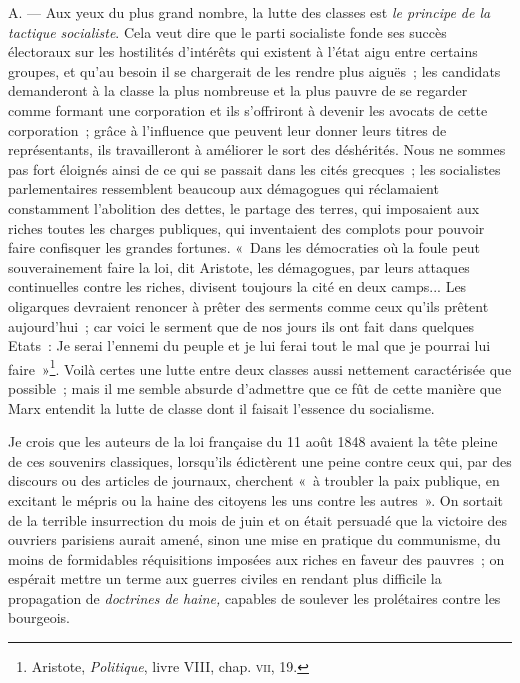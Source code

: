 \documentclass[french,twoside]{book} %
\begin{document}
\noindent A. — Aux yeux du plus grand nombre, la lutte des classes est \emph{le principe de la tactique socialiste}. Cela veut dire que le parti socialiste fonde ses succès électoraux sur les hostilités d’intérêts qui existent à l’état aigu entre certains groupes, et qu’au besoin il se chargerait de les rendre plus aiguës ; les candidats demanderont à la classe la plus nombreuse et la plus pauvre de se regarder comme formant une corporation et ils s’offriront à devenir  les avocats de cette corporation ; grâce à l’influence que peuvent leur donner leurs titres de représentants, ils travailleront à améliorer le sort des déshérités. Nous ne sommes pas fort éloignés ainsi de ce qui se passait dans les cités grecques ; les socialistes parlementaires ressemblent beaucoup aux démagogues qui réclamaient constamment l’abolition des dettes, le partage des terres, qui imposaient aux riches toutes les charges publiques, qui inventaient des complots pour pouvoir faire confisquer les grandes fortunes. « Dans les démocraties où la foule peut souverainement faire la loi, dit Aristote, les démagogues, par leurs attaques continuelles contre les riches, divisent toujours la cité en deux camps... Les oligarques devraient renoncer à prêter des serments comme ceux qu’ils prêtent aujourd’hui ; car voici le serment que de nos jours ils ont fait dans quelques Etats : Je serai l’ennemi du peuple et je lui ferai tout le mal que je pourrai lui faire »\footnote{ \noindent Aristote, \emph{Politique}, livre VIII, chap. {\scshape vii}, 19.
 }. Voilà certes une lutte entre deux classes aussi nettement caractérisée que possible ; mais il me semble absurde d’admettre que ce fût de cette manière que Marx entendit la lutte de classe dont il faisait l’essence du socialisme.\par
Je crois que les auteurs de la loi française du 11 août 1848 avaient la tête pleine de ces souvenirs classiques, lorsqu’ils édictèrent une peine contre ceux qui, par des discours ou des articles de journaux, cherchent « à troubler la paix publique, en excitant le mépris ou la haine des citoyens les uns contre les autres ». On sortait de la  terrible insurrection du mois de juin et on était persuadé que la victoire des ouvriers parisiens aurait amené, sinon une mise en pratique du communisme, du moins de formidables réquisitions imposées aux riches en faveur des pauvres ; on espérait mettre un terme aux guerres civiles en rendant plus difficile la propagation de \emph{doctrines de haine,} capables de soulever les prolétaires contre les bourgeois.\par
\end{document}

